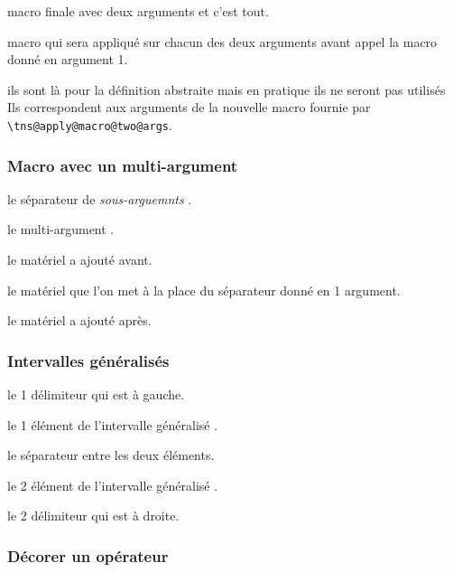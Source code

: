 \documentclass[12pt,a4paper]{article}
\newcommand\env[1]{\texttt{#1}}
\newcommand\macro[1]{\env{\textbackslash{}#1}}
\theoremstyle{definition}
\begin{document}
{{{{{{{{{{{ macro finale avec deux arguments et c'est tout.

 macro qui sera appliqué sur chacun des deux arguments avant appel la macro donné en argument 1.

 ils sont là pour la définition abstraite mais en pratique ils ne seront pas utilisés
Ils correspondent aux arguments de la nouvelle macro fournie par \macro{tns@apply@macro@two@args}.


\subsubsection{Macro avec un \og multi-argument \fg}




 le séparateur de \emph{\og sous-arguemnts \fg}.

 le \og multi-argument \fg.

 le matériel a ajouté avant.

 le matériel que l'on met à la place du séparateur donné en 1\ier{} argument.

 le matériel a ajouté après.


\subsubsection{Intervalles \og généralisés \fg}






 le 1\ier{} délimiteur qui est à gauche.

 le 1\ier{} élément de l'intervalle \og généralisé \fg.

 le séparateur entre les deux éléments.

 le 2\ieme{} élément de l'intervalle \og généralisé \fg.

 le 2\ier{} délimiteur qui est à droite.


\subsubsection{Décorer un opérateur}




}}}}}}}}}}}
\end{document}
